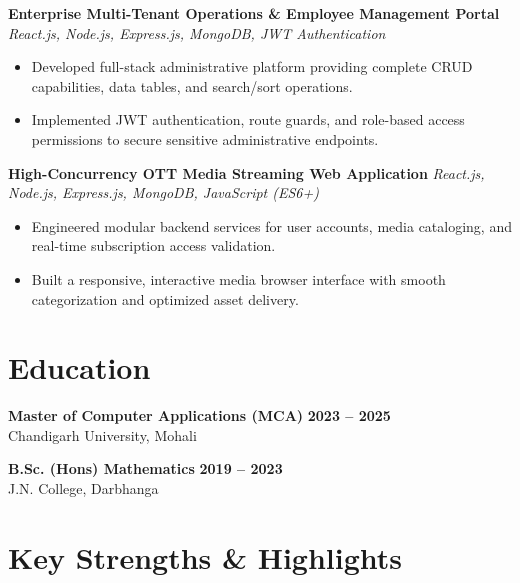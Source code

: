 \documentclass[a4paper,10pt]{article}
\begin{document}
\textbf{Enterprise Multi-Tenant Operations \& Employee Management Portal}
\hfill
\textit{React.js, Node.js, Express.js, MongoDB, JWT Authentication}

\begin{itemize}

    \item Developed full-stack administrative platform providing complete CRUD capabilities, data tables, and search/sort operations.

    \item Implemented JWT authentication, route guards, and role-based access permissions to secure sensitive administrative endpoints.

\end{itemize}


\textbf{High-Concurrency OTT Media Streaming Web Application}
\hfill
\textit{React.js, Node.js, Express.js, MongoDB, JavaScript (ES6+)}

\begin{itemize}

    \item Engineered modular backend services for user accounts, media cataloging, and real-time subscription access validation.

    \item Built a responsive, interactive media browser interface with smooth categorization and optimized asset delivery.

\end{itemize}

\section*{Education}

\textbf{Master of Computer Applications (MCA)}
\hfill
\textbf{2023 -- 2025}
\\
Chandigarh University, Mohali

\vspace{3pt}

\textbf{B.Sc. (Hons) Mathematics}
\hfill
\textbf{2019 -- 2023}
\\
J.N. College, Darbhanga

\section*{Key Strengths \& Highlights}
\end{document}

